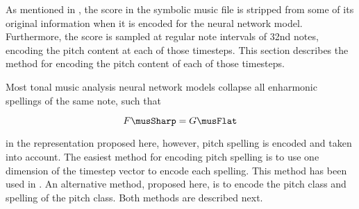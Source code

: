 
As mentioned in , the score in
the symbolic music file is stripped from some of its
original information when it is encoded for the neural
network model. Furthermore, the score is sampled at regular
note intervals of \gls{32nd} notes, encoding the pitch
content at each of those timesteps. This section describes
the method for encoding the pitch content of each of those
timesteps. 

Most tonal music analysis neural network models collapse all
enharmonic spellings of the same note, such that 

$$F\musSharp = G\musFlat$$

in the representation proposed here, however, pitch spelling
is encoded and taken into account. The easiest method for
encoding pitch spelling is to use one dimension of the
timestep vector to encode each spelling. This method has
been used in \textcite{micchi2020not, micchi2021deep}. An
alternative method, proposed here, is to encode the pitch
class and spelling of the pitch class. Both methods are
described next.
